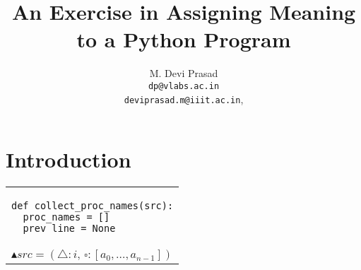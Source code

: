 \documentclass[10pt, a4paper]{article}
\begin{document}
\title{An Exercise in Assigning Meaning to a Python Program}
\author{M. Devi Prasad\vspace*{1.5mm}\\\texttt{dp@vlabs.ac.in}\\\texttt{deviprasad.m@iiit.ac.in},}
\date{}
\maketitle


\section{Introduction}

\noindent\begin{tabular}{l}
{\lstset{language=Python, basicstyle=\ttfamily\small, backgroundcolor=\color{gray}}
\begin{lstlisting}
def collect_proc_names(src):
  proc_names = []
  prev_line = None
\end{lstlisting}}\\
$\blacktriangle{src} = (\triangle:i, \, \square:[a_{0}, \ldots, a_{n-1}])$
\end{tabular}\\
\end{document}
